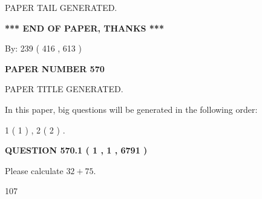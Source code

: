\documentclass[12pt]{article}
\begin{document}
   
   
   
   
   
 \vspace{0.2in}
 
   
   
\vspace{2.0in} PAPER TAIL GENERATED.
   
   
   
   
\vspace{1.0in} 
{\textbf{\large{ *** END OF PAPER, THANKS *** }}} 
   
   
\hspace{1.0in} By: 
 239 ( 416 ,  613 )
   
   
   
   
\newpage 
\setcounter{page}{ 
   570001 } 
   
   
   
   
 {\textbf{ \Large{ PAPER NUMBER  570  }}}
   
   
\vspace{0.2in}
   
   
   
   
   
   
   
   
 \vspace{0.2in}
 
 
 
 
   
   
 PAPER TITLE GENERATED.
   
   
   
\vspace{0.2in}
   
In this paper, big questions will be generated in the following order: 
   
   
   1 ( 1 )
 ,
   2 ( 2 )
 .
  
\vspace{0.2in}
  
{\textbf{\Large{QUESTION
570.1 
 ( 1 , 1 , 6791 )
}}}
  
  
 
Please calculate $ %
32 +  %
75 $.
 
 
 
\noindent{}
 
 

107
 
 
\noindent{}
 
\end{document}

